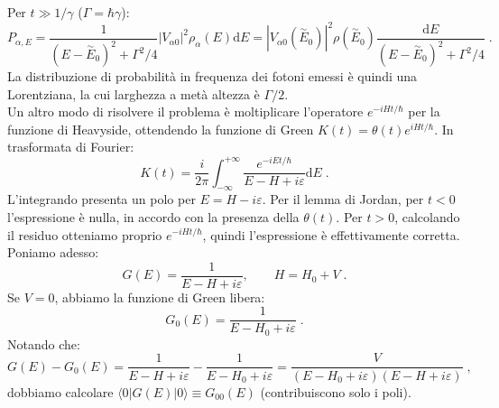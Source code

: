 \documentclass[12pt,a4paper]{report}
\theoremstyle{definition}
\numberwithin{equation}{section}
\newcommand{\diff}[1][]{\mathrm{d}#1}
\newcommand{\bra}{\langle}
\newcommand{\ket}{\rangle}
\begin{document}
Per $t\gg 1/\gamma$ ($\Gamma=\hbar\gamma$):
\begin{equation}
P_{\alpha,E}=\frac{1}{(E-\stackrel{\sim}{E}_0)^2+\Gamma^2/4}|V_{\alpha 0}|^2\rho_{\alpha}(E)\diff{E}=|V_{\alpha 0}(\stackrel{\sim}{E}_0)|^2\rho(\stackrel{\sim}{E}_0)\frac{\diff{E}}{(E-\stackrel{\sim}{E}_0)^2+\Gamma^2/4}\;.
\end{equation}
La distribuzione di probabilità in frequenza dei fotoni emessi è quindi una Lorentziana, la cui larghezza a metà altezza è $\Gamma/2$. \\
Un altro modo di risolvere il problema è moltiplicare l'operatore $e^{-iHt/\hbar}$ per la funzione di Heavyside, ottendendo la funzione di Green $K(t)=\theta(t)e^{iHt/\hbar}$. In trasformata di Fourier:
\begin{equation}
K(t)=\frac{i}{2\pi}\int_{-\infty}^{+\infty}\frac{e^{-iEt/\hbar}}{E-H+i\varepsilon}\diff{E}\;.
\end{equation}
L'integrando presenta un polo per $E=H-i\varepsilon$. Per il lemma di Jordan, per $t<0$ l'espressione è nulla, in accordo con la presenza della $\theta(t)$. Per $t>0$, calcolando il residuo otteniamo proprio $e^{-iHt/\hbar}$, quindi l'espressione è effettivamente corretta. Poniamo adesso:
\begin{equation}
G(E)=\frac{1}{E-H+i\varepsilon},\qquad H=H_0+V\;.
\end{equation}
Se $V=0$, abbiamo la funzione di Green libera:
\begin{equation}
G_0(E)=\frac{1}{E-H_0+i\varepsilon}\;.
\end{equation}
Notando che:
\begin{equation}
G(E)-G_0(E)=\frac{1}{E-H+i\varepsilon}-\frac{1}{E-H_0+i\varepsilon}=\frac{V}{(E-H_0+i\varepsilon)(E-H+i\varepsilon)}\;,
\end{equation}
dobbiamo calcolare $\bra 0|G(E)|0\ket\equiv G_{00}(E)$ (contribuiscono solo i poli).
\end{document}
